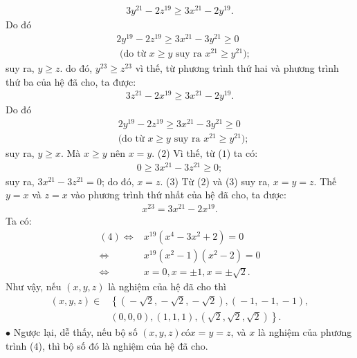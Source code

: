 \begin{multicols}{2}
	\begin{align*}
		3{y^{21}} - 2{z^{19}} \ge 3{x^{21}} - 2{y^{19}}.
	\end{align*}
	Do đó 
	\begin{align*}
		&2{y^{19}} - 2{z^{19}} \ge 3{x^{21}} - 3{y^{21}} \ge 0 \\[-0.5ex]
		&\text{ (do từ } x \ge y \text{ suy ra } x^{21} \ge y^{21});
	\end{align*}
	suy ra, $y \ge z$. do đó,  $y^{23} \ge z^{23}$ vì thế, từ phương trình thứ hai và phương trình thứ ba của hệ đã cho, ta được:
	\begin{align*}
		3{z^{21}} - 2{x^{19}} \ge 3{x^{21}} - 2{y^{19}}.
	\end{align*}
	Do đó
	\begin{align*}
		&2{y^{19}} - 2{z^{19}} \ge 3{x^{21}} - 3{y^{21}} \ge 0 \\[-0.5ex]
		&\text{(do từ } x \ge y \text{ suy ra } x^{21} \ge y^{21}); \tag{$1$}
	\end{align*}
	suy ra, $y \ge x$. Mà $x \ge y$ nên $x = y$.  \hfill ($2$)
	\vskip 0.05cm
	Vì thế, từ ($1$) ta có:
	\begin{align*}
		0 \ge 3{x^{21}} - 3{z^{21}} \ge 0;
	\end{align*}
	suy ra, $3{x^{21}} - 3{z^{21}} = 0$; do đó, $x = z$. \hfill ($3$)
	\vskip 0.05cm
	Từ ($2$) và ($3$) suy ra, $x = y = z$.
	\vskip 0.05cm
	Thế $y = x$ và $z = x$ vào phương trình thứ nhất của hệ đã cho, ta được:
	\begin{align*}
		{x^{23}} = 3{x^{21}} - 2{x^{19}}. \tag{$4$}
	\end{align*}
	Ta có:
	\begin{align*}
		(4) \Leftrightarrow& {x^{19}}\left( {{x^4} - 3{x^2} + 2} \right) = 0\\[-0.5ex]
			\Leftrightarrow &{x^{19}}\left( {{x^2} - 1} \right)\left( {{x^2} - 2} \right) = 0\\[-0.5ex]
			\Leftrightarrow & x = 0,x =  \pm 1,x =  \pm \sqrt 2 .
	\end{align*}
	Như vậy, nếu $(x, y, z)$ là nghiệm của hệ đã cho thì
	\begin{align*}
		\left( {x,y,z} \right) \in &\left\{\!\! \left( { \!-\! \sqrt 2 , \!-\! \sqrt 2 , \!-\! \sqrt 2 } \right)\!,\!\left( { \!-\! 1, \!-\! 1, \!-\! 1} \right)\!,\right.\\[-0.5ex]
		&\left.\left( {0,0,0} \right)\!,\!\left( {1,1,1} \right)\!,\!\left( {\sqrt 2 ,\sqrt 2 ,\sqrt 2 } \right)\!\! \right\}\!.
	\end{align*}
	$\bullet$ Ngược lại, dễ thấy, nếu bộ số $(x, y, z) có x = y = z$, và $x$ là nghiệm của phương trình ($4$), thì bộ số đó là nghiệm của hệ đã cho.

\end{multicols}
